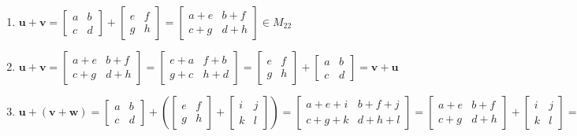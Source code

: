 \documentclass{report}
\begin{document}
\begin{enumerate}
    \item $\bm{u} + \bm{v} = 
    \begin{bmatrix}
    a & b \\
    c & d
    \end{bmatrix} 
    +
    \begin{bmatrix}
    e & f \\
    g & h
    \end{bmatrix}
    =
    \begin{bmatrix}
        a + e & b + f \\
        c + g & d + h
    \end{bmatrix} \in M_{22}$
    \item $\bm{u} + \bm{v} =
    \begin{bmatrix}
        a + e & b + f \\
        c + g & d + h
    \end{bmatrix} 
    =
    \begin{bmatrix}
        e + a & f + b \\
        g + c & h + d
    \end{bmatrix}
    =
    \begin{bmatrix}
    e & f \\
    g & h
    \end{bmatrix}
    +
    \begin{bmatrix}
    a & b \\
    c & d
    \end{bmatrix} 
    = 
    \bm{v} + \bm{u}$

    \item $\bm{u} + (\bm{v} + \bm{w}) = 
    \begin{bmatrix}
    a & b \\
    c & d
    \end{bmatrix} 
    +
    \left(
    \begin{bmatrix}
    e & f \\
    g & h
    \end{bmatrix}
    +
    \begin{bmatrix}
        i & j \\
        k & l
    \end{bmatrix}
    \right)
    =
    \begin{bmatrix}
        a + e + i & b + f + j \\
        c + g + k & d + h + l
    \end{bmatrix}
    =
    \begin{bmatrix}
        a + e & b + f \\
        c + g & d + h
    \end{bmatrix}
    +
    \begin{bmatrix}
        i & j \\
        k & l
    \end{bmatrix}
    =
    \left(\bm{u} + \bm{v}\right) + \bm{w}
    $


\end{enumerate}
\end{document}
